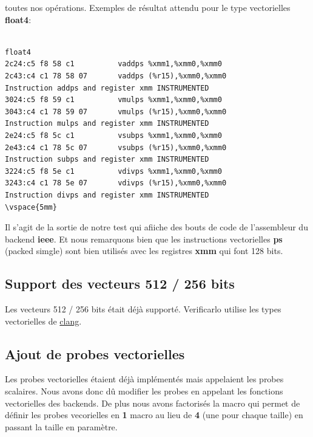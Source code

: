 \documentclass[11pt]{article}
\begin{document}
toutes nos opérations.
\vspace{5mm}
Exemples de résultat attendu pour le type vectorielles \textbf{float4}:
\vspace{5mm}
\begin{verbatim}

float4
2c24:c5 f8 58 c1          vaddps %xmm1,%xmm0,%xmm0
2c43:c4 c1 78 58 07       vaddps (%r15),%xmm0,%xmm0
Instruction addps and register xmm INSTRUMENTED
3024:c5 f8 59 c1          vmulps %xmm1,%xmm0,%xmm0
3043:c4 c1 78 59 07       vmulps (%r15),%xmm0,%xmm0
Instruction mulps and register xmm INSTRUMENTED
2e24:c5 f8 5c c1          vsubps %xmm1,%xmm0,%xmm0
2e43:c4 c1 78 5c 07       vsubps (%r15),%xmm0,%xmm0
Instruction subps and register xmm INSTRUMENTED
3224:c5 f8 5e c1          vdivps %xmm1,%xmm0,%xmm0
3243:c4 c1 78 5e 07       vdivps (%r15),%xmm0,%xmm0
Instruction divps and register xmm INSTRUMENTED
\vspace{5mm}
\end{verbatim}
\vspace{5mm}
Il s'agit de la sortie de notre test qui afiiche des bouts de code de
l'assembleur du backend \textbf{ieee}. Et nous remarquons bien que les instructions
vectorielles \textbf{ps} (packed simgle) sont bien utilisés avec les registres
\textbf{xmm} qui font 128 bits.

\subsection{Support des vecteurs 512 / 256 bits}
\label{sec:orgd19a3ae}

Les vecteurs 512 / 256 bits était déjà supporté.
\vspace{5mm}
Verificarlo utilise les types vectorielles de \href{https://clang.llvm.org/docs/LanguageExtensions.html\#vectors-and-extended-vectors}{clang}.

\subsection{Ajout de probes vectorielles}
\label{sec:org67fb326}

Les probes vectorielles étaient déjà implémentés mais appelaient les
probes scalaires.
\vspace{5mm}
Nous avons donc dû modifier les probes en appelant les fonctions
vectorielles des backends.
\vspace{5mm}
De plus nous avons factorisés la macro qui permet de définir les
probes vecorielles en \textbf{1} macro au lieu de \textbf{4} (une pour chaque
taille) en passant la taille en paramètre.
\end{document}

